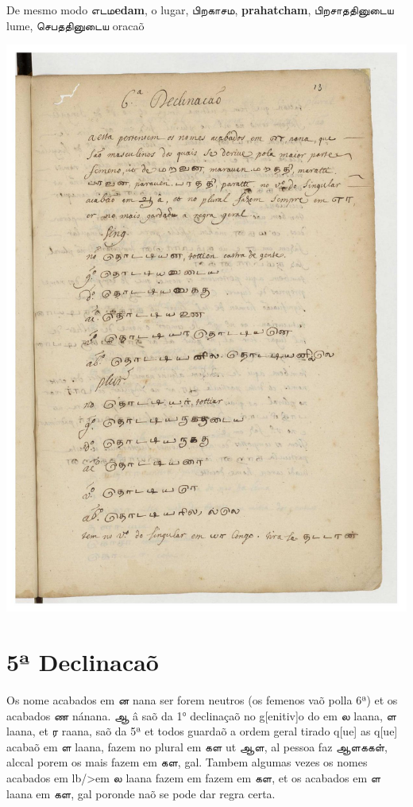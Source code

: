 \documentclass[12pt,a4paper]{scrbook}
\begin{document}
      

 De mesmo modo எடம\textbf{edam}, o lugar, பிறகாசம, \textbf{prahatcham},   பிறசாததினுடைய  lume,   செபததினுடைய  oracaõ

      
\newpage
\hypertarget{img-35}{
    \includegraphics[width=\textwidth]{img-35}}
\newpage
      \chapter*{5ª Declinacaõ}
    
      

 Os nome acabados em ன  nana ser forem neutros (os femenos vaõ polla 6ª) et os acabados ண nánana.  
ஆ â saõ da 1° declinaçaõ no g[enitiv]o do 
            em ல laana, ள laana, et ர raana, saõ da 5ª et todos guardaõ a ordem
            geral tirado q[ue] as q[ue] 
	      acabaõ em ள laana, fazem no plural em கள ut ஆள, al pessoa faz  ஆளககள், alccal porem os mais
            fazem em கள, gal. Tambem algumas vezes os nomes acabados em lb/>em ல laana fazem em fazem em கள, et os 
	     acabados em ள laana em கள, gal poronde naõ
            se pode dar regra certa.
        
\end{document}
